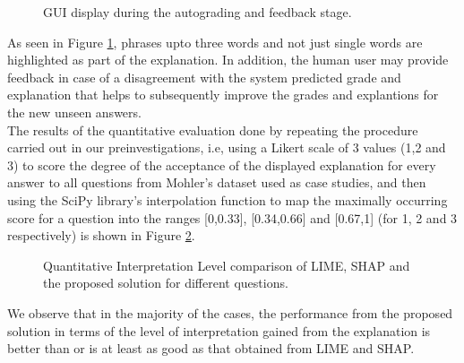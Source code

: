 \documentclass[letterpaper, 10 pt, conference]{ieeeconf}  %
\begin{document}
\begin{figure}[H]
\caption{GUI display during the autograding and feedback stage.}
\label{fig:gui3}
\end{figure}
As seen in Figure \ref{fig:gui3}, phrases upto three words and not just single words are highlighted as part of the explanation. In addition, the human user may provide feedback in case of a disagreement with the system predicted grade and explanation that helps to subsequently improve the grades and explantions for the new unseen answers.\\
The results of the quantitative evaluation done by repeating the procedure carried out in our preinvestigations, i.e, using a Likert scale of 3 values (1,2 and 3) to score the degree of the acceptance of the displayed explanation for every answer to all questions from Mohler's dataset used as case studies, and then using the SciPy library’s interpolation function to map the maximally occurring score for a question into the ranges [0,0.33], [0.34,0.66] and [0.67,1] (for 1, 2 and 3 respectively) is shown in Figure \ref{fig:comparison2}.
\begin{figure}[H]
\caption{Quantitative Interpretation Level comparison of LIME, SHAP and the proposed solution for different questions.}
\label{fig:comparison2}
\end{figure}
We observe that in the majority of the cases, the performance from the proposed solution in terms of the level of interpretation gained from the explanation is better than or is at least as good as that obtained from LIME and SHAP.
\end{document}
